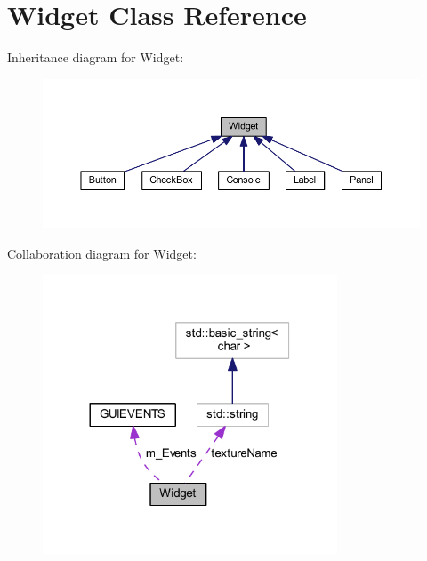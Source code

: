 \hypertarget{class_widget}{}\section{Widget Class Reference}
\label{class_widget}


Inheritance diagram for Widget\+:
\nopagebreak
\begin{figure}[H]
\begin{center}
\leavevmode
\includegraphics[width=350pt]{class_widget__inherit__graph}
\end{center}
\end{figure}


Collaboration diagram for Widget\+:
\nopagebreak
\begin{figure}[H]
\begin{center}
\leavevmode
\includegraphics[width=248pt]{class_widget__coll__graph}
\end{center}
\end{figure}
